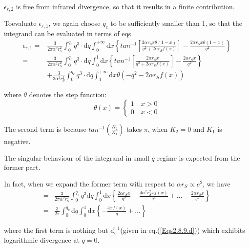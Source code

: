 $\epsilon_{r,2}$ is free from infrared divergence, so that it results in a finite contribution.

Toevaluate $\epsilon_{r,1}$, we again choose $q_c$ to be sufficiently smaller than 1, so that the integrand can be evaluated in terms of eqs.
\begin{equation} \label{Eqs2.8.41} \begin{split}
\epsilon_{r,1} =& \frac{3}{2\pi \alpha^2 r_S^2}\int_0^{q_c} q^3\cdot \mathrm{d} q \int_0^{+\infty} \mathrm{d} x \left\{ tan^{-1}\left[ \frac{2\alpha r_S x \theta(1-x)}{q^2+2\alpha r_S f(x)} \right] - \frac{2\alpha r_S x \theta(1-x)}{q^2} \right\}\\
=& \frac{3}{2\pi \alpha^2 r_S^2}\int_0^{q_c} q^3 \cdot \mathrm{d} q \int_0^{1} \mathrm{d} x \left\{ tan^{-1}\left[ \frac{2\alpha r_S x}{q^2+2\alpha r_S f(x)} \right] - \frac{2\alpha r_S x}{q^2} \right\}\\
&+\frac{3}{2\alpha^2 r_S^2} \int_0^{q_c} q^3 \cdot\mathrm{d}q \int_1^{+\infty} \mathrm{d} x \theta(-q^2-2\alpha r_S f(x))
\end{split}\end{equation}

where $\theta$ denotes the step function:
\[\theta(x) = \left\{ \begin{split} 1 \quad x> 0\\
0 \quad x<0 \end{split} \right.\]

The second term is because $tan^{-1}(\frac{K_2}{K_1})$ takes $\pi$, when $K_2=0$ and $K_1$ is negative.

The singular behaviour of the integrand in small $q$ regime is expected from the former part.

In fact, when we expand the former term with respect to $\alpha r_S \propto e^2$, we have
\begin{equation*} \label{Eqs2.8.41'} \tag{2.8.41'}
\begin{split}=& \frac{3}{2\pi \alpha^2 r_S^2} \int_0^{q_c} q^3 \mathrm{d} q \int_0^1 \mathrm{d} x \left\{ \frac{2\alpha r_S x}{q^2} - \frac{4\alpha^2 r_S^2 x f(x)}{q^4} + \ldots - \frac{2\alpha r_S x}{q^2} \right\}\\
=& \frac{3}{2\pi} \int_0^{q_c} \mathrm{d} q \int_0^1 \mathrm{d} x \left\{ -\frac{4 x f(x)}{q} + \ldots \right\}
\end{split}\end{equation*}

where the first term is nothing but $\epsilon_2^{r,1}$(given in eq.(\ref{Eqs2.8.9.d})) which exhibits logarithmic divergence at $q=0$.

